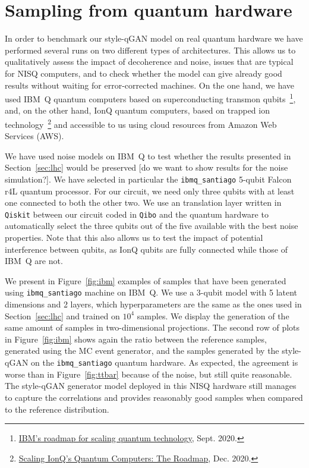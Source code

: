 \documentclass[twocolumn,preprintnumbers,superscriptaddress]{revtex4-2}
\begin{document}
\section{Sampling from quantum hardware}
\label{sec:deployment}

In order to benchmark our style-qGAN model on real quantum hardware we
have performed several runs on two different types of
architectures. This allows us to qualitatively assess the impact of
decoherence and noise, issues that are typical for NISQ computers, and
to check whether the model can give already good results without
waiting for error-corrected machines. On the one hand, we have used IBM~Q
quantum computers based on superconducting transmon
qubits~\footnote{\href{https://research.ibm.com/blog/ibm-quantum-roadmap}{IBM's roadmap for scaling quantum technology}, Sept. 2020.}, and, on the other hand, IonQ quantum computers, based on trapped ion technology~\footnote{\href{https://IonQ.com/posts/december-09-2020-scaling-quantum-computer-roadmap}{Scaling IonQ's Quantum Computers: The Roadmap}, Dec. 2020.} and
accessible to us using cloud resources from Amazon Web Services
(AWS).

{\color{red}We have used noise models on IBM~Q to test whether the results
presented in Section~\ref{sec:lhc} would be preserved [do we want to
show results for the noise simulation?].} We have
selected in particular the {\tt ibmq\_santiago} 5-qubit Falcon r4L quantum processor.
For our circuit, we need only three qubits with at least one connected to both the other two.
We use an translation layer written in \texttt{Qiskit} between our circuit coded in \texttt{Qibo} and the quantum hardware to automatically select the three qubits out of the five available with the best noise properties.
Note that this also allows
us to test the impact of potential interference between qubits, as
IonQ qubits are fully connected while those of IBM~Q are
not.

We present in Figure~\ref{fig:ibm} examples of samples that have been
generated using {\tt ibmq\_santiago} machine on IBM~Q. We use a 3-qubit
model with 5 latent dimensions and 2 layers, which hyperparameters are
the same as the ones used in Section~\ref{sec:lhc} and trained on
$10^4_{}$ samples. We display the generation of the same amount of
samples in two-dimensional projections. The second row of plots in
Figure~\ref{fig:ibm} shows again the ratio between the reference
samples, generated using the MC event generator, and the samples
generated by the style-qGAN on the {\tt ibmq\_santiago} quantum
hardware. As expected, the agreement is worse than in
Figure~\ref{fig:ttbar} because of the noise, but still quite
reasonable. The
style-qGAN generator model deployed in this NISQ hardware still
manages to capture the correlations and provides reasonably good
samples when compared to the reference distribution.
\end{document}
